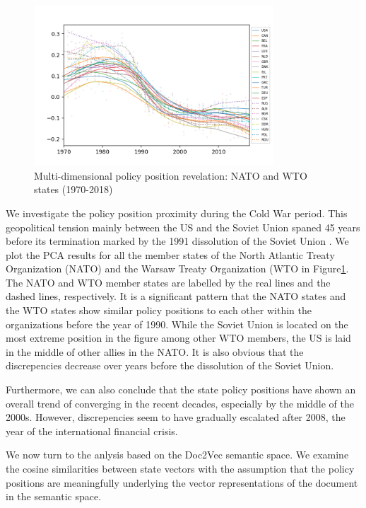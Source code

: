 \documentclass[final,authoryear,3p,12pt,times,hidelinks]{elsarticle}
\begin{document}
\begin{figure}[ht!]
  \begin{center}
    \includegraphics[width=0.8\textwidth]{graphs/tfidf_pca_2.png}
    \caption{Multi-dimensional policy position revelation: NATO and WTO states (1970-2018)}
    \label{fig:tfidf pca 2}
  \end{center}
\end{figure}

We investigate the policy position proximity during the Cold War period. This geopolitical tension mainly between the US and the Soviet Union spaned 45 years before its termination marked by the 1991 dissolution of the Soviet Union \citep{plan80marshall}. We plot the PCA results for all the member states of the North Atlantic Treaty Organization (NATO) and the Warsaw Treaty Organization (WTO in Figure\ref{fig:tfidf pca 2}. The NATO and WTO member states are labelled by the real lines and the dashed lines, respectively. It is a significant pattern that the NATO states and the WTO states show similar policy positions to each other within the organizations before the year of 1990. While the Soviet Union is located on the most extreme position in the figure among other WTO members, the US is laid in the middle of other allies in the NATO. It is also obvious that the discrepencies decrease over years before the dissolution of the Soviet Union. 

Furthermore, we can also conclude that the state policy positions have shown an overall trend of converging in the recent decades, especially by the middle of the 2000s. However, discrepencies seem to have gradually escalated after 2008, the year of the international financial crisis. 

We now turn to the anlysis based on the Doc2Vec semantic space. We examine the cosine similarities between state vectors with the assumption that the policy positions are meaningfully underlying the vector representations of the document in the semantic space. 
\end{document}
